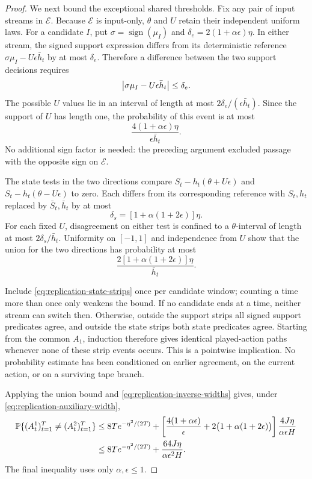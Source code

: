 \begin{proof}
We next bound the exceptional shared thresholds. Fix any pair of input
streams in $\mathcal E$. Because $\mathcal E$ is input-only, $\theta$
and $U$ retain their independent uniform laws. For a candidate $I$, put
$\sigma=\operatorname{sign}(\mu_I)$ and
$\delta_e=2(1+\alpha\epsilon)\eta$. In either stream, the signed support
expression differs from its deterministic reference
$\sigma\mu_I-U\epsilon\bar h_t$ by at most $\delta_e$. Therefore a
difference between the two support decisions requires
\[
 \left|\sigma\mu_I-U\epsilon\bar h_t\right|\le\delta_e.
\]
The possible $U$ values lie in an interval of length at most
$2\delta_e/(\epsilon\bar h_t)$. Since the support of $U$ has length one,
the probability of this event is at most
\begin{equation}
 \frac{4(1+\alpha\epsilon)\eta}{\epsilon\bar h_t}.
 \label{eq:replication-support-strip}
\end{equation}
No additional sign factor is needed: the preceding argument excluded
passage with the opposite sign on $\mathcal E$.

The state tests in the two directions compare
$S_t-h_t(\theta+U\epsilon)$ and $S_t-h_t(\theta-U\epsilon)$ to zero.
Each differs from its corresponding reference with $S_t,h_t$ replaced
by $\bar S_t,\bar h_t$ by at most
\[
 \delta_s=[1+\alpha(1+2\epsilon)]\eta.
\]
For each fixed $U$, disagreement on either test is confined to a
$\theta$-interval of length at most $2\delta_s/\bar h_t$. Uniformity on
$[-1,1]$ and independence from $U$ show that the union for the two
directions has probability at most
\begin{equation}
 \frac{2[1+\alpha(1+2\epsilon)]\eta}{\bar h_t}.
 \label{eq:replication-state-strips}
\end{equation}

Include \eqref{eq:replication-state-strips} once per candidate window;
counting a time more than once only weakens the bound. If no candidate
ends at a time, neither stream can switch then. Otherwise, outside the
support strips all signed support predicates agree, and outside the
state strips both state predicates agree. Starting from the common
$A_1$, induction therefore gives identical played-action paths whenever
none of these strip events occurs. This is a pointwise implication. No
probability estimate has been conditioned on earlier agreement, on the
current action, or on a surviving tape branch.

Applying the union bound and \eqref{eq:replication-inverse-widths} gives,
under \eqref{eq:replication-auxiliary-width},
\begin{align}
 \mathbb P\{(A_t^1)_{t=1}^T\ne(A_t^2)_{t=1}^T\}
 &\le 8T e^{-\eta^2/(2T)}
  +\left[\frac{4(1+\alpha\epsilon)}{\epsilon}
      +2\bigl(1+\alpha(1+2\epsilon)\bigr)\right]
      \frac{4J\eta}{\alpha\epsilon H}\notag\\
 &\le 8T e^{-\eta^2/(2T)}
      +\frac{64J\eta}{\alpha\epsilon^2H}.
 \label{eq:replication-general-bound}
\end{align}
The final inequality uses only $\alpha,\epsilon\le1$.


\end{proof}
